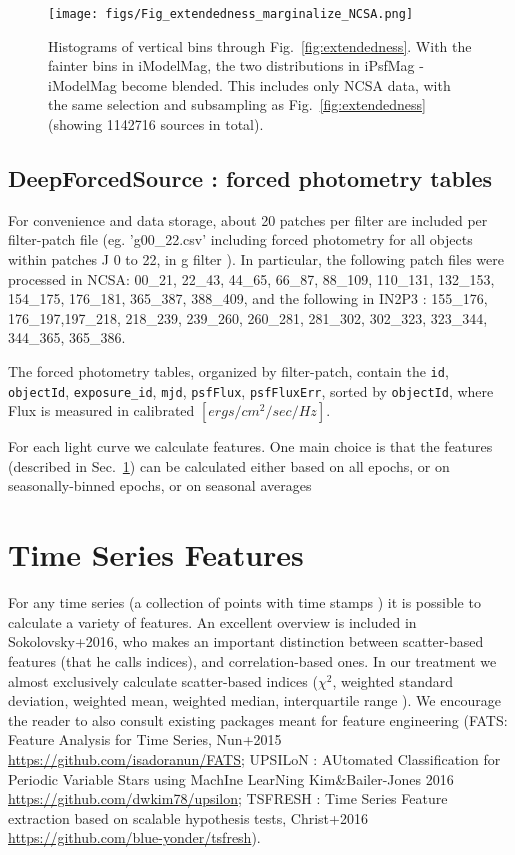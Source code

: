 \documentclass[fleqn,usenatbib]{mnras}  %
\begin{document}
\begin{figure*}
\texttt{[image: figs/Fig\_extendedness\_marginalize\_NCSA.png]}
\caption{Histograms of vertical bins through Fig.~\ref{fig:extendedness}. With the fainter bins in iModelMag, the two distributions in iPsfMag - iModelMag become blended. This includes only NCSA data, with the same selection and subsampling as Fig.~\ref{fig:extendedness} (showing 1142716 sources in total).}
\label{fig:extendedness_marginalized}
\end{figure*}



\subsection{DeepForcedSource : forced photometry tables}


For convenience and  data storage, about 20 patches per filter are included per filter-patch file (eg. 'g00\_22.csv' including forced photometry for all objects within patches J 0 to 22, in g filter  ). In particular, the following patch files  were processed in NCSA: 00\_21, 22\_43, 44\_65, 66\_87, 88\_109, 110\_131, 132\_153, 154\_175, 176\_181, 365\_387, 388\_409,  and the following in IN2P3 : 155\_176, 176\_197,197\_218, 218\_239, 239\_260, 260\_281, 281\_302, 302\_323, 323\_344, 344\_365, 365\_386.


The forced photometry tables, organized by filter-patch, contain the \verb|id|, \verb|objectId|, \verb|exposure_id|, \verb|mjd|, \verb|psfFlux|, \verb|psfFluxErr|, sorted by \verb|objectId|, where Flux is measured in calibrated $[ergs/ cm^{2} / sec / Hz]$.  


For each light curve we calculate features. One main choice is that the features (described in  Sec.~\ref{sec:features}) can be calculated either based on all epochs, or on  seasonally-binned epochs, or on seasonal averages 



\section{Time Series Features}
\label{sec:features}
For any time series (a collection of points with time stamps ) it is possible to calculate a variety of features. An excellent overview is included in Sokolovsky+2016, who makes an important distinction between scatter-based features (that he calls indices), and correlation-based ones. In our treatment we almost exclusively calculate scatter-based indices ($\chi^{2}$, weighted standard deviation, weighted mean, weighted median, interquartile range ). We encourage the reader to also consult existing packages meant for feature engineering (FATS: Feature Analysis for Time Series, Nun+2015 \url{https://github.com/isadoranun/FATS};  UPSILoN : AUtomated Classification for Periodic Variable Stars using MachIne LearNing Kim\&Bailer-Jones 2016 \url{https://github.com/dwkim78/upsilon};  TSFRESH : Time Series Feature extraction based on scalable hypothesis tests,  Christ+2016 \url{https://github.com/blue-yonder/tsfresh}). 
\end{document}
